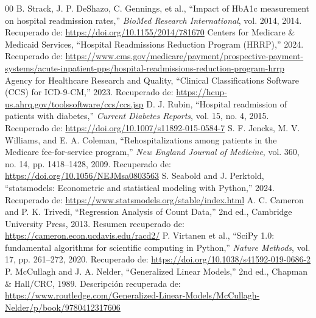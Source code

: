 \documentclass[conference]{IEEEtran}
\begin{document}
\begin{thebibliography}{00}
 B. Strack, J. P. DeShazo, C. Gennings, et al., ``Impact of HbA1c measurement on hospital readmission rates,'' \textit{BioMed Research International}, vol. 2014, 2014. Recuperado de: \url{https://doi.org/10.1155/2014/781670}
 Centers for Medicare \& Medicaid Services, ``Hospital Readmissions Reduction Program (HRRP),'' 2024. Recuperado de: \url{https://www.cms.gov/medicare/payment/prospective-payment-systems/acute-inpatient-pps/hospital-readmissions-reduction-program-hrrp}
 Agency for Healthcare Research and Quality, ``Clinical Classifications Software (CCS) for ICD-9-CM,'' 2023. Recuperado de: \url{https://hcup-us.ahrq.gov/toolssoftware/ccs/ccs.jsp}
 D. J. Rubin, ``Hospital readmission of patients with diabetes,'' \textit{Current Diabetes Reports}, vol. 15, no. 4, 2015. Recuperado de: \url{https://doi.org/10.1007/s11892-015-0584-7}
 S. F. Jencks, M. V. Williams, and E. A. Coleman, ``Rehospitalizations among patients in the Medicare fee-for-service program,'' \textit{New England Journal of Medicine}, vol. 360, no. 14, pp. 1418--1428, 2009. Recuperado de: \url{https://doi.org/10.1056/NEJMsa0803563}
 S. Seabold and J. Perktold, ``statsmodels: Econometric and statistical modeling with Python,'' 2024. Recuperado de: \url{https://www.statsmodels.org/stable/index.html}
 A. C. Cameron and P. K. Trivedi, ``Regression Analysis of Count Data,'' 2nd ed., Cambridge University Press, 2013. Resumen recuperado de: \url{https://cameron.econ.ucdavis.edu/racd2/}
 P. Virtanen et al., ``SciPy 1.0: fundamental algorithms for scientific computing in Python,'' \textit{Nature Methods}, vol. 17, pp. 261--272, 2020. Recuperado de: \url{https://doi.org/10.1038/s41592-019-0686-2}
 P. McCullagh and J. A. Nelder, ``Generalized Linear Models,'' 2nd ed., Chapman \& Hall/CRC, 1989. Descripción recuperada de: \url{https://www.routledge.com/Generalized-Linear-Models/McCullagh-Nelder/p/book/9780412317606}
\end{thebibliography}
\end{document}
